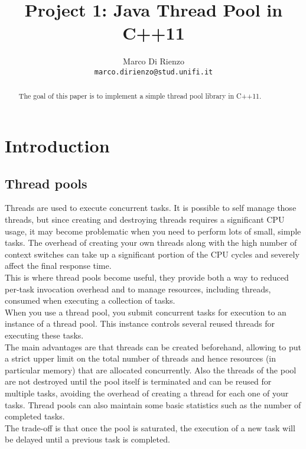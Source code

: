 \documentclass[10pt,twocolumn,letterpaper]{article}
\begin{document}
	
	\title{Project 1: Java Thread Pool in C++11}
	
	\author{Marco Di Rienzo\\
		{\tt\small marco.dirienzo@stud.unifi.it}
	}
	
	\maketitle
	\thispagestyle{empty}
	
	\begin{abstract}
		The goal of this paper is to implement a simple thread pool library in C++11.
	\end{abstract}
	
	\section{Introduction}
	\subsection{Thread pools}
	Threads are used to execute concurrent tasks. It is possible to self manage those threads, but since creating and destroying threads requires a significant CPU usage, it may become problematic when you need to perform lots of small, simple tasks. The overhead of creating your own threads along with the high number of context switches can take up a significant portion of the CPU cycles and severely affect the final response time.\\
	This is where thread pools become useful, they provide both a way to reduced per-task invocation overhead and to manage resources, including threads, consumed when executing a collection of tasks.\\
	When you use a thread pool, you submit concurrent tasks for execution to an instance of a thread pool. This instance controls several reused threads for executing these tasks.\\
	The main advantages are that threads can be created beforehand, allowing to put a strict upper limit on the total number of threads and hence resources (in particular memory) that are allocated concurrently. Also the threads of the pool are not destroyed until the pool itself is terminated and can be reused for multiple tasks, avoiding the overhead of creating a thread for each one of your tasks. Thread pools can also maintain some basic statistics such as the number of completed tasks.\\
	The trade-off is that once the pool is saturated, the execution of a new task will be delayed until a previous task is completed.
\end{document}
